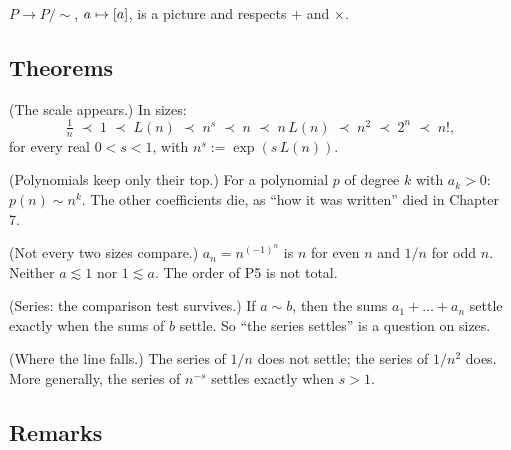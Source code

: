 \begin{lines}
\item[\lab{P7}] $P \to P/{\sim}$, $a \mapsto [a]$, is a picture and respects $+$ and $\times$.
\end{lines}

\subsection*{Theorems}

\begin{lines}
\item[\lab{T1}] (The scale appears.) In sizes:
\[
\tfrac{1}{n} \;\prec\; 1 \;\prec\; L(n) \;\prec\; n^{s} \;\prec\; n \;\prec\; n\,L(n) \;\prec\; n^2 \;\prec\; 2^n \;\prec\; n! ,
\]
for every real $0 < s < 1$, with $n^s := \exp(s\, L(n))$.
\item[\lab{T2}] (Polynomials keep only their top.) For a polynomial $p$ of degree $k$ with $a_k > 0$: \ $p(n) \sim n^k$. The other coefficients die, as ``how it was written'' died in Chapter 7.
\item[\lab{T3}] (Not every two sizes compare.) $a_n = n^{(-1)^n}$ is $n$ for even $n$ and $1/n$ for odd $n$. Neither $a \lesssim 1$ nor $1 \lesssim a$. The order of P5 is not total.
\item[\lab{T4}] (Series: the comparison test survives.) If $a \sim b$, then the sums $a_1 + \dots + a_n$ settle exactly when the sums of $b$ settle. So ``the series settles'' is a question on sizes.
\item[\lab{T5}] (Where the line falls.) The series of $1/n$ does not settle; the series of $1/n^2$ does. More generally, the series of $n^{-s}$ settles exactly when $s > 1$.
\end{lines}

\subsection*{Remarks}

